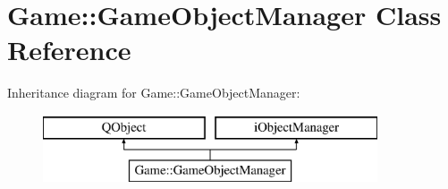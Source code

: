 \hypertarget{class_game_1_1_game_object_manager}{\section{Game\-:\-:Game\-Object\-Manager Class Reference}
\label{class_game_1_1_game_object_manager}
}
Inheritance diagram for Game\-:\-:Game\-Object\-Manager\-:\begin{figure}[H]
\begin{center}
\leavevmode
\includegraphics[height=2.000000cm]{class_game_1_1_game_object_manager}
\end{center}
\end{figure}
